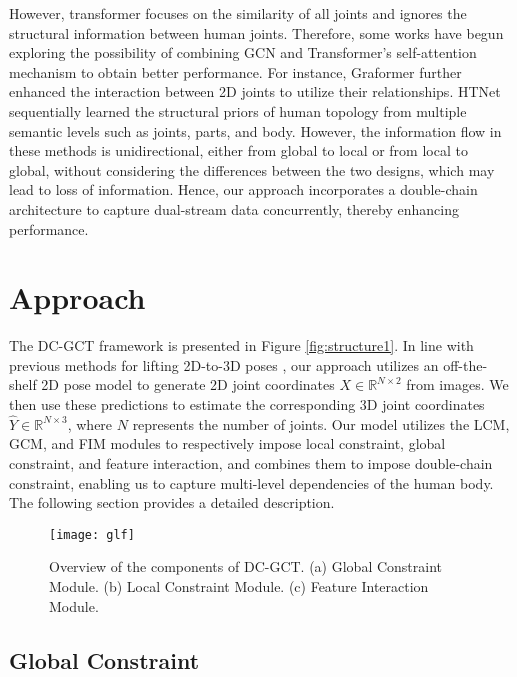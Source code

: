 \documentclass[journal]{IEEEtran}
\begin{document}
However, transformer focuses on the similarity of all joints and ignores the structural information between human joints. Therefore, some works have begun exploring the possibility of combining GCN and Transformer's self-attention mechanism to obtain better performance. For instance, Graformer \cite{zhao2022graformer} further enhanced the interaction between 2D joints to utilize their relationships. HTNet \cite{cai2023htnet} sequentially learned the structural priors of human topology from multiple semantic levels such as joints, parts, and body. However, the information flow in these methods is unidirectional, either from global to local or from local to global, without considering the differences between the two designs, which may lead to loss of information. Hence, our approach incorporates a double-chain architecture to capture dual-stream data concurrently, thereby enhancing performance.


\section{Approach}




The DC-GCT framework is presented in Figure \ref{fig:structure1}. In line with previous methods for lifting 2D-to-3D poses \cite{martinez2017simple,zhao2019semantic}, our approach utilizes an off-the-shelf 2D pose model to generate 2D joint coordinates $X \in \mathbb{R}^{N \times 2}$ from images. We then use these predictions to estimate the corresponding 3D joint coordinates $\widehat{Y} \in \mathbb{R}^{N \times 3}$, where $N$ represents the number of joints. Our model utilizes the LCM, GCM, and FIM modules to respectively impose local constraint, global constraint, and feature interaction, and combines them to impose double-chain constraint, enabling us to capture multi-level dependencies of the human body. The following section provides a detailed description.



\begin{figure}[t]
  \centering
  \texttt{[image: glf]}
  \caption{Overview of the components of DC-GCT. (a) Global Constraint Module. (b) Local Constraint Module.  (c) Feature Interaction Module.}
\label{fig:structure2}
\end{figure}



\subsection{Global Constraint}
\end{document}
